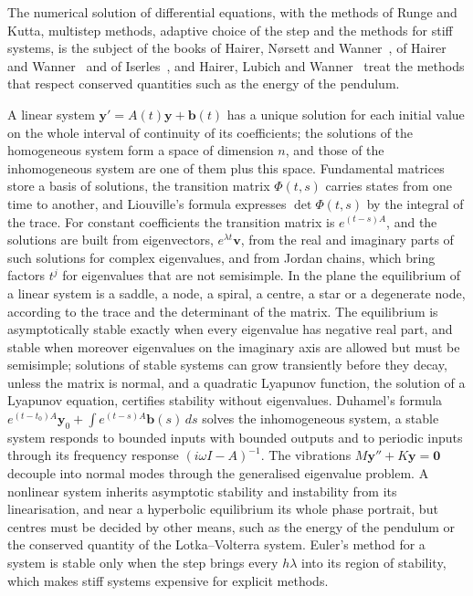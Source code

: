 The numerical solution of differential equations, with the methods of Runge and Kutta, multistep methods, adaptive choice of the step and the methods for stiff systems, is the subject of the books of Hairer, N{\o}rsett and Wanner~\cite{hairer1993}, of Hairer and Wanner~\cite{hairer1996stiff} and of Iserles~\cite{iserles2008}, and Hairer, Lubich and Wanner~\cite{hairer2006geometric} treat the methods that respect conserved quantities such as the energy of the pendulum.

\bigskip
A linear system $\mathbf y'=A(t)\mathbf y+\mathbf b(t)$ has a unique solution for each initial value on the whole interval of continuity of its coefficients; the solutions of the homogeneous system form a space of dimension $n$, and those of the inhomogeneous system are one of them plus this space. Fundamental matrices store a basis of solutions, the transition matrix $\Phi(t,s)$ carries states from one time to another, and Liouville's formula expresses $\det\Phi(t,s)$ by the integral of the trace. For constant coefficients the transition matrix is $e^{(t-s)A}$, and the solutions are built from eigenvectors, $e^{\lambda t}\mathbf v$, from the real and imaginary parts of such solutions for complex eigenvalues, and from Jordan chains, which bring factors $t^j$ for eigenvalues that are not semisimple. In the plane the equilibrium of a linear system is a saddle, a node, a spiral, a centre, a star or a degenerate node, according to the trace and the determinant of the matrix. The equilibrium is asymptotically stable exactly when every eigenvalue has negative real part, and stable when moreover eigenvalues on the imaginary axis are allowed but must be semisimple; solutions of stable systems can grow transiently before they decay, unless the matrix is normal, and a quadratic Lyapunov function, the solution of a Lyapunov equation, certifies stability without eigenvalues. Duhamel's formula $e^{(t-t_0)A}\mathbf y_0+\int e^{(t-s)A}\mathbf b(s)\,ds$ solves the inhomogeneous system, a stable system responds to bounded inputs with bounded outputs and to periodic inputs through its frequency response $(i\omega I-A)^{-1}$. The vibrations $M\mathbf y''+K\mathbf y=\mathbf 0$ decouple into normal modes through the generalised eigenvalue problem. A nonlinear system inherits asymptotic stability and instability from its linearisation, and near a hyperbolic equilibrium its whole phase portrait, but centres must be decided by other means, such as the energy of the pendulum or the conserved quantity of the Lotka--Volterra system. Euler's method for a system is stable only when the step brings every $h\lambda$ into its region of stability, which makes stiff systems expensive for explicit methods.


